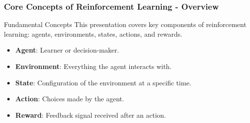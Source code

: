 \documentclass[aspectratio=169]{beamer}
\begin{document}
\begin{frame}[fragile]
    \frametitle{Core Concepts of Reinforcement Learning - Overview}
    \begin{block}{Fundamental Concepts}
        This presentation covers key components of reinforcement learning: 
        agents, environments, states, actions, and rewards.
    \end{block}
    \begin{itemize}
        \item \textbf{Agent}: Learner or decision-maker.
        \item \textbf{Environment}: Everything the agent interacts with.
        \item \textbf{State}: Configuration of the environment at a specific time.
        \item \textbf{Action}: Choices made by the agent.
        \item \textbf{Reward}: Feedback signal received after an action.
    \end{itemize}
\end{frame}
\end{document}
